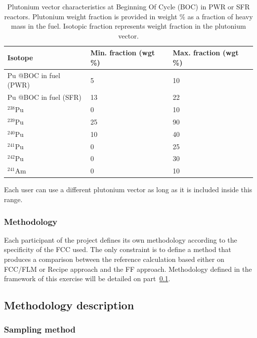 \documentclass[review]{elsarticle}
\begin{document}
\begin{table}[]
\begin{center}
    \begin{tabular}{|l|l|l|}
        \hline
        Isotope & Min. fraction (wgt \%) & Max. fraction (wgt \%) \\
        \hline
        Pu @BOC in fuel (PWR) & 5 & 10 \\
        Pu @BOC in fuel (SFR) & 13 & 22 \\
        \hline
        $^{238}$Pu & 0 & 10 \\
        $^{239}$Pu & 25 & 90 \\
        $^{240}$Pu & 10 & 40 \\
        $^{241}$Pu & 0 & 25 \\
        $^{242}$Pu & 0 & 30 \\
        $^{241}$Am & 0 & 10 \\
        \hline
    \end{tabular}
\end{center}
\caption{Plutonium vector characteristics at Beginning Of Cycle (BOC) in PWR or SFR reactors. Plutonium weight fraction is provided in weight \% as a fraction of heavy mass in the fuel. Isotopic fraction represents weight fraction in the plutonium vector.}
\label{tab:PuVector}
\end{table}


Each user can use a different plutonium vector as long as it is included inside this range.
    
\subsubsection{Methodology}

Each participant of the project defines its own methodology according to the specificity of the FCC used. The only constraint is to define a method that produces a comparison between the reference calculation based either on FCC/FLM or Recipe approach and the FF approach. Methodology defined in the framework of this exercise will be detailed on part~\ref{section:Methodology}.

\subsection{Methodology description}\label{section:Methodology}

    \subsubsection{Sampling method}
\end{document}
